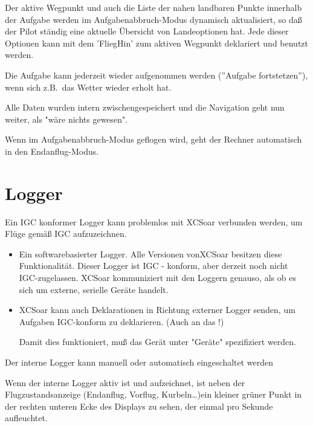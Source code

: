 Der aktive  Wegpunkt und auch die Liste der nahen landbaren Punkte innerhalb der Aufgabe werden im Aufgabenabbruch-Modus dynamisch aktualisiert, so daß der Pilot ständig eine aktuelle Übersicht von Landeoptionen hat.  Jede dieser Optionen kann  mit dem 'FliegHin' zum aktiven Wegpunkt deklariert und benutzt werden.

Die Aufgabe kann jederzeit wieder aufgenommen werden (''Aufgabe fortstetzen''), wenn sich z.B.\ das Wetter wieder erholt hat.

Alle Daten wurden intern zwischengespeichert und die Navigation geht nun weiter, als "wäre nichts gewesen".

\textcolor[rgb]{0.00,0.25,0.50}{\textsf{Wenn im Aufgabenabbruch-Modus geflogen wird, geht der \achtung Rechner automatisch in den  Endanflug-Modus.}}
%
\section{Logger}

Ein IGC konformer Logger kann problemlos mit \textsf{XCSoar} verbunden werden, um Flüge gemäß IGC aufzuzeichnen.  

\begin{itemize}
\item Ein softwarebasierter Logger.  Alle Versionen von\textsf{XCSoar}  besitzen diese Funktionalität.  Dieser Logger ist IGC - konform, aber derzeit noch nicht IGC-zugelassen.
\textsf{XCSoar} kommuniziert mit den Loggern genauso, als ob es sich um externe, serielle Geräte handelt.
\item\textsf{XCSoar} kann auch Deklarationen in Richtung externer Logger senden, um Aufgaben IGC-konform zu deklarieren. (Auch an das \fl!)

Damit dies funktioniert, muß das Gerät unter "Geräte" spezifiziert werden. 
\end{itemize}

Der interne Logger kann manuell oder automatisch eingeschaltet werden

Wenn der interne Logger aktiv ist und aufzeichnet, ist neben der Flugzustandsanzeige (Endanflug, Vorflug, Kurbeln\dots)ein kleiner grüner Punkt
in der rechten unteren Ecke des Displays zu sehen, der einmal pro Sekunde aufleuchtet.


